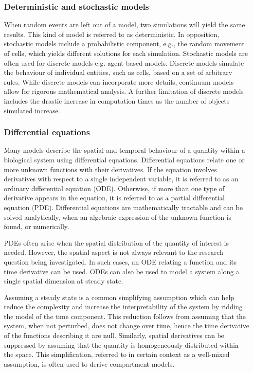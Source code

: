 \documentclass{article}
\begin{document}
\subsubsection*{Deterministic and stochastic models}

When random events are left out of a model, two simulations will yield the same results.
This kind of model is referred to as deterministic.
In opposition, stochastic models include a probabilistic component, e.g., the random movement of cells, which yields different solutions for each simulation.
Stochastic models are often used for discrete models e.g. agent-based models.
Discrete models simulate the behaviour of individual entities, such as cells, based on a set of arbitrary rules.
While discrete models can incorporate more details, continuum models allow for rigorous mathematical analysis.
A further limitation of discrete models includes the drastic increase in computation times as the number of objects simulated increase.

\subsubsection*{Differential equations}

Many models describe the spatial and temporal behaviour of a quantity within a biological system using differential equations.
Differential equations relate one or more unknown functions with their derivatives.
If the equation involves derivatives with respect to a single independent variable, it is referred to as an ordinary differential equation (ODE).
Otherwise, if more than one type of derivative appears in the equation, it is referred to as a partial differential equation (PDE).
Differential equations are mathematically tractable and can be solved analytically, when an algebraic expression of the unknown function is found, or numerically.

PDEs often arise when the spatial distribution of the quantity of interest is needed.
However, the spatial aspect is not always relevant to the research question being investigated.
In such cases, an ODE relating a function and its time derivative can be used.
ODEs can also be used to model a system along a single spatial dimension at steady state.

Assuming a steady state is a common simplifying assumption which can help reduce the complexity and increase the interpretability of the system by ridding the model of the time component.
This reduction follows from assuming that the system, when not perturbed, does not change over time, hence the time derivative of the functions describing it are null.
Similarly, spatial derivatives can be suppressed by assuming that the quantity is homogeneously distributed within the space.
This simplification, referred to in certain context as a well-mixed assumption, is often used to derive compartment models.
\end{document}
